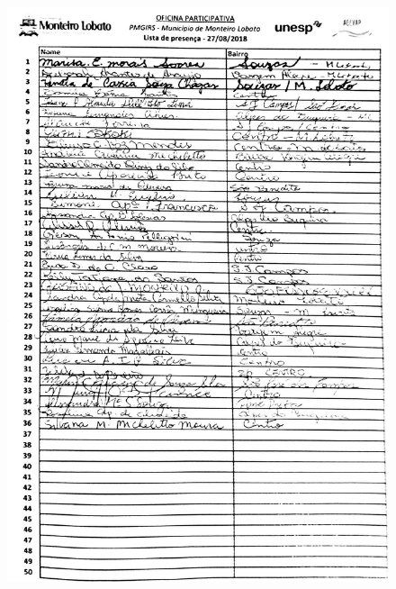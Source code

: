 \begin{figure}[h]
	\centering
	\includegraphics[width=.75\linewidth]{produtos/prodtres/image123}
	\caption*{}
	\label{fig:image123}
\end{figure}

\FloatBarrier
\newpage
